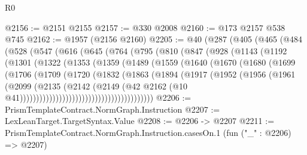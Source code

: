 \begin{lexlean}{R0}
\begin{coremodule}
@2156 := @2151 @2155
@2157 := @330 @2008
@2160 := @173 @2157 @538 @745
@2162 := @1957 (@2156 @2160)
@2205 := @40
    (@287
      (@405
        (@465
          (@484
            (@528
              (@547
                (@616
                  (@645
                    (@764
                      (@795
                        (@810
                          (@847
                            (@928
                              (@1143
                                (@1192
                                  (@1301
                                    (@1322
                                      (@1353
                                        (@1359
                                          (@1489
                                            (@1559
                                              (@1640
                                                (@1670
                                                  (@1680
                                                    (@1699
                                                      (@1706
                                                        (@1709
                                                          (@1720
                                                            (@1832
                                                              (@1863
                                                                (@1894
                                                                  (@1917
                                                                    (@1952
                                                                      (@1956
                                                                        (@1961
                                                                          (@2099
                                                                            (@2135
                                                                              (@2142
                                                                                (@2149
                                                                                  (@42
                                                                                    @2162
                                                                                    (@10
                                                                                      @41)))))))))))))))))))))))))))))))))))))))))
@2206 := PrismTemplateContract.NormGraph.Instruction
@2207 := LexLeanTarget.TargetSyntax.Value
@2208 := @2206 -> @2207
@2211 := PrismTemplateContract.NormGraph.Instruction.casesOn.{1} (fun ("_" : @2206) => @2207)

\end{coremodule}
\end{lexlean}

